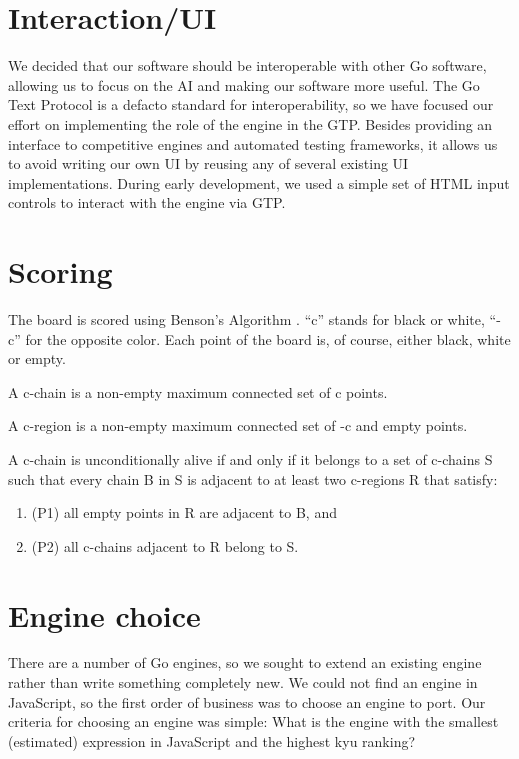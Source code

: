 \documentclass{memoir}
\begin{document}
\chapter{Interaction/UI}

We decided that our software should be interoperable with other Go software, allowing us to focus on the AI and making our software more useful. The Go Text Protocol \cite{GTP} is a defacto standard for interoperability, so we have focused our effort on implementing the role of the engine in the GTP. Besides providing an interface to competitive engines and automated testing frameworks, it allows us to avoid writing our own UI by reusing any of several existing UI implementations. During early development, we used a simple set of HTML input controls to interact with the engine via GTP.

\chapter{Scoring}

The board is scored using Benson's Algorithm \cite{Benson76}. ``c'' stands for black or white, ``-c'' for the opposite color. Each point of the board is, of course, either black, white or empty.

\begin{defn}A c-chain is a non-empty maximum connected set of c points.
\end{defn}

\begin{defn}A c-region is a non-empty maximum connected set of -c and empty points.
\end{defn}

\begin{defn}
A c-chain is unconditionally alive if and only if it belongs to a set of c-chains S such that every chain B in S is adjacent to at least two c-regions R that satisfy:

\begin{enumerate}
  \item (P1) all empty points in R are adjacent to B, and 

  \item (P2) all c-chains adjacent to R belong to S.
\end{enumerate}
\end{defn}

\chapter{Engine choice}
There are a number of Go engines, so we sought to extend an existing engine rather than write something completely new. We could not find an engine in JavaScript, so the first order of business was to choose an engine to port. Our criteria for choosing an engine was simple: What is the engine with the smallest (estimated) expression in JavaScript and the highest kyu ranking?
\end{document}
